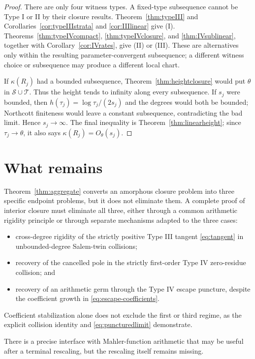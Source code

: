 \documentclass[11pt,reqno]{amsart}
\theoremstyle{definition}
\theoremstyle{remark}
\newcommand{\calS}{\mathcal S}
\newcommand{\calT}{\mathcal T}
\begin{document}
\begin{proof}
There are only four witness types.  A fixed-type subsequence cannot be Type I
or II by their closure results.  Theorem~\ref{thm:typeIII} and
Corollaries~\ref{cor:typeIIIstrata} and \ref{cor:IIIlinear} give (I).
Theorems~\ref{thm:typeIVcompact}, \ref{thm:typeIVclosure}, and
\ref{thm:IVsublinear}, together with Corollary~\ref{cor:IVrates}, give (II)
or (III).  These are alternatives only within the resulting
parameter-convergent subsequence; a different witness choice or subsequence
may produce a different local chart.

If $\kappa(R_j)$ had a bounded subsequence, Theorem~\ref{thm:heightclosure}
would put $\theta$ in $\calS\cup\calT$.  Thus the height tends to infinity
along every subsequence.  If $s_j$ were bounded, then
$h(\tau_j)=\log\tau_j/(2s_j)$ and the degrees would both be bounded;
Northcott finiteness would leave a constant subsequence, contradicting the
bad limit.  Hence $s_j\to\infty$.  The final inequality is
Theorem~\ref{thm:linearheight}; since $\tau_j\to\theta$, it also says
$\kappa(R_j)=O_\theta(s_j)$.
\end{proof}

\section{What remains}

Theorem~\ref{thm:aggregate} converts an amorphous closure problem into three
specific endpoint problems, but it does not eliminate them.  A complete
proof of interior closure must eliminate all three, either through a common
arithmetic rigidity principle or through separate mechanisms adapted to the
three cases:
\begin{itemize}
\item cross-degree rigidity of the strictly positive Type III tangent
\eqref{eq:tangent} in unbounded-degree Salem-twin collisions;
\item recovery of the cancelled pole in the strictly first-order Type IV
zero-residue collision; and
\item recovery of an arithmetic germ through the Type IV escape puncture,
despite the coefficient growth in \eqref{eq:escape-coefficients}.
\end{itemize}
Coefficient stabilization alone does not exclude the first or third regime,
as the explicit collision identity and \eqref{eq:puncturedlimit} demonstrate.

There is a precise interface with Mahler-function arithmetic that may be
useful after a terminal rescaling, but the rescaling itself remains missing.
\end{document}
